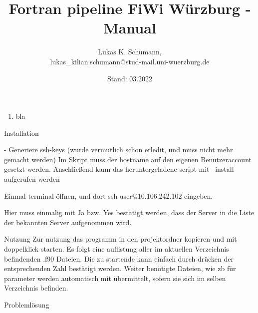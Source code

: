 \documentclass[12pt, a4paper]{article}
\title{Fortran pipeline FiWi Würzburg - Manual}
\author{Lukas K. Schumann, \\\small{lukas\_kilian.schumann@stud-mail.uni-wuerzburg.de}}
\date{Stand: 03.2022}
\begin{document}
\maketitle

\bigskip\noindent

\begin{enumerate}[leftmargin=-1em]
    \item bla
\end{enumerate}



\huge{Installation}

- Generiere ssh-keys (wurde vermutlich schon erledit, und muss nicht mehr gemacht werden)
Im Skript muss der hostname auf den eigenen Benutzeraccount gesetzt werden.
Anschließend kann das heruntergeladene script mit --install aufgerufen werden

Einmal terminal öffnen, und dort ssh user@10.106.242.102 eingeben.

Hier muss einmalig mit Ja bzw. Yes bestätigt werden, dass der Server in die Liste der bekannten Server aufgenommen wird.


\huge{Nutzung}
Zur nutzung das programm in den projektordner kopieren und mit doppelklick starten.
Es folgt eine auflistung aller im aktuellen Verzeichnis befindenden .f90 Dateien.
Die zu startende kann einfach durch drücken der entsprechenden Zahl bestätigt werden.
Weiter benötigte Dateien, wie zb für parameter werden automatisch mit übermittelt, sofern sie sich im selben Verzeichnis befinden.


\huge{Problemlösung}
\end{document}
